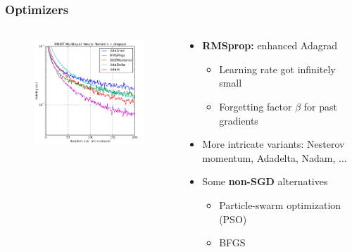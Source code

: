 \documentclass[aspectratio=1610]{beamer}
\newcommand\imageright[1]{ %
    \caption*{\scalebox{.5}{\textcolor{lightgray}{\textcopyright~#1}}} %
}
\begin{document}
\begin{frame}
\frametitle{Optimizers}

\begin{columns}
    \begin{column}{0.48\textwidth}
        \begin{figure}
            \includegraphics[width=\linewidth]{optimizers.png}
            \imageright{Machine Learning Mastery}
        \end{figure}
    \end{column}
    \begin{column}{0.48\textwidth}
        \begin{itemize}
            \item \textbf{RMSprop:} enhanced Adagrad
            \begin{itemize}
                \item Learning rate got infinitely small
                \item Forgetting factor $\beta$ for past gradients
            \end{itemize}
            \item More intricate variants: Nesterov momentum, Adadelta, Nadam, $\dots$
            \item Some \textbf{non-SGD} alternatives
            \begin{itemize}
                \item Particle-swarm optimization (PSO)
                \item BFGS
            \end{itemize}
        \end{itemize}
    \end{column}
\end{columns}
\end{frame}
\end{document}
